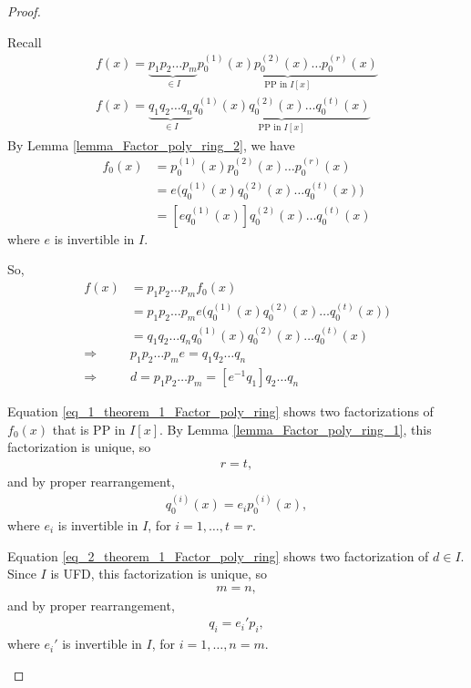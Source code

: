 \documentclass[utf8]{ctexbook}
\begin{document}
\begin{proof}
\begin{enumerate}
{\begin{itemize}
{Recall
\begin{align*}
f(x) = \underbrace{p_1 p_2 \ldots p_m}_{\in I}  \underbrace{p_0 ^{(1)} (x) p_0 ^{(2)} (x) \ldots p_0 ^{(r)} (x) }_{\mbox{PP in } I[x]} \\
f(x) = \underbrace{q_1 q_2 \ldots q_n}_{\in I}  \underbrace{q_0 ^{(1)} (x) q_0 ^{(2)} (x) \ldots q_0 ^{(t)} (x) }_{\mbox{PP in } I[x]}
\end{align*}
By Lemma \ref{lemma_Factor_poly_ring_2}, we have
\begin{align}
f_0 (x) &= p_0 ^{(1)} (x) p_0 ^{(2)} (x) \ldots p_0 ^{(r)} (x) \nonumber \\
&= e \Big( q_0 ^{(1)} (x) q_0 ^{(2)} (x) \ldots q_0 ^{(t)} (x)  \Big) \nonumber \\
&= [e q_0 ^{(1)} (x) ] q_0 ^{(2)} (x) \ldots q_0 ^{(t)} (x)  \label{eq_1_theorem_1_Factor_poly_ring}
\end{align}
where $e$ is invertible in $I$.

So,
\begin{align}
f(x) &= p_1 p_2 \ldots p_m f_0 (x) \nonumber \\
&= p_1 p_2 \ldots p_m e \Big( q_0 ^{(1)} (x) q_0 ^{(2)} (x) \ldots q_0 ^{(t)} (x)  \Big) \nonumber \\
&=  q_1 q_2 \ldots q_n q_0 ^{(1)} (x) q_0 ^{(2)} (x) \ldots q_0 ^{(t)} (x) \nonumber \\
\Longrightarrow & p_1 p_2 \ldots p_m e  = q_1 q_2 \ldots q_n  \nonumber \\
\Longrightarrow & d = p_1 p_2 \ldots p_m = [e^{-1}  q_1] q_2 \ldots q_n \label{eq_2_theorem_1_Factor_poly_ring} 
\end{align}

Equation \ref{eq_1_theorem_1_Factor_poly_ring} shows two factorizations of $f_0 (x)$ that is PP in $I[x]$. By Lemma \ref{lemma_Factor_poly_ring_1}, this factorization is unique, so
\begin{align*}
r = t ,
\end{align*}
and by proper rearrangement,
\begin{align*}
q_0 ^{(i)} (x) = e_i p_0 ^{(i)} (x),
\end{align*}
where $e_i$ is invertible in $I$, for $i = 1, \ldots, t=r $.

Equation \ref{eq_2_theorem_1_Factor_poly_ring} shows two factorization of $d \in I$. Since $I$ is UFD, this factorization is unique, so
\begin{align*}
m = n,
\end{align*}
and by proper rearrangement,
\begin{align*}
q_i = e_i ' p_i ,
\end{align*}
where $e_i '$ is invertible in $I$, for $i = 1, \ldots, n=m $.

}
\end{itemize}}
\end{enumerate}
\end{proof}
\end{document}
